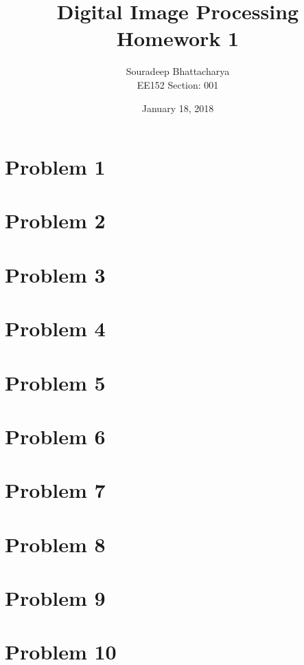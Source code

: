 \documentclass{article}
\title{Digital Image Processing \\ Homework 1}
\date{January 18, 2018}
\author{Souradeep Bhattacharya \\ EE152 Section: 001}
\begin{document}
	\maketitle
	\section*{Problem 1}
	\section*{Problem 2}
	\section*{Problem 3}
	\section*{Problem 4}
	\section*{Problem 5}
	\section*{Problem 6}
	\section*{Problem 7}
	\section*{Problem 8}
	\section*{Problem 9}
	\section*{Problem 10}
\end{document}
